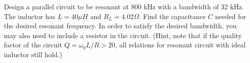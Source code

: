 % 

%
%
% 


\item Design a parallel circuit to be resonant at 800 kHz with a bandwidth
of 32 kHz. The inductor has $L=40 \mu H$ and $R_L=4.02 \Omega$. Find the
capacitance $C$ needed for the desired resonant frequency. In order to
satisfy the desired bandwidth, you may also need to include a resistor 
in the circuit. (Hint, note that if the quality factor of the circuit
$Q=\omega_0 L/R > 20$, all relations for resonant circuit with ideal
inductor still hold.)



